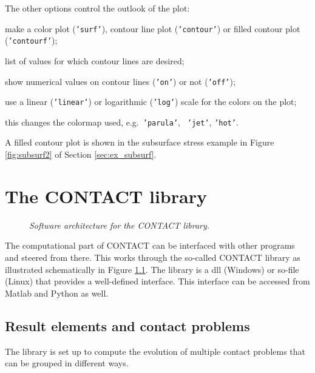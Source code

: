 \documentclass[12pt]{report}
\begin{document}
The other options control the outlook of the plot:
\begin{description}[leftmargin=6em,style=nextline]
\item[typplot] make a color plot ({\tt 'surf'}), contour line plot
        ({\tt 'contour'}) or filled contour plot ({\tt 'contourf'});
\item[cntrlvl] list of values for which contour lines are desired;
\item[clabel] show numerical values on contour lines ({\tt 'on'}) or
        not ({\tt 'off'});
\item[scale] use a linear ({\tt 'linear'}) or logarithmic ({\tt 'log'})
        scale for the colors on the plot;
\item[colormap] this changes the colormap used, e.g.\ {\tt 'parula'}, {\tt
        'jet'}, {\tt 'hot'}.
\end{description}
A filled contour plot is shown in the subsurface stress example in Figure
\ref{fig:subsurf2} of Section \ref{sec:ex_subsurf}.


\chapter{The CONTACT library}
\label{chp:contact_library}

\begin{figure}[bt]
\centering
{}
\caption{\em Software architecture for the CONTACT library.}
\label{fig:arch_lib}
\end{figure}

The computational part of CONTACT can be interfaced with other programs and
steered from there. This works through the so-called CONTACT library as
illustrated schematically in Figure \ref{fig:arch_lib}. The library is a
dll (Windows) or so-file (Linux) that provides a well-defined interface.
This interface can be accessed from Matlab and Python as well.

\section{Result elements and contact problems}

The library is set up to compute the evolution of multiple contact problems
that can be grouped in different ways.
\end{document}

